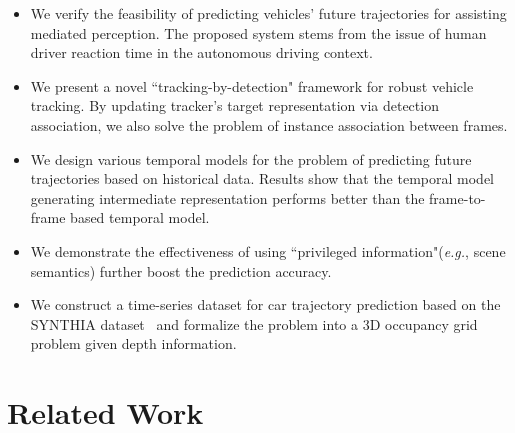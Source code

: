 \documentclass[10pt,twocolumn,letterpaper]{article}
\begin{document}
\begin{itemize}

\item We verify the feasibility of predicting vehicles' future trajectories for assisting mediated perception. The proposed system stems from the issue of human driver reaction time in the autonomous driving context.

\item We present a novel ``tracking-by-detection" framework for robust vehicle tracking. By updating tracker's target representation via detection association, we also solve the problem of instance association between frames.

\item We design various temporal models for the problem of predicting future trajectories based on historical data. Results show that the temporal model generating intermediate representation performs better than the frame-to-frame based temporal model.

\item We demonstrate the effectiveness of using ``privileged information"(\emph{e.g.}, scene semantics) further boost the prediction accuracy.


\item We construct a time-series dataset for car trajectory prediction based on the SYNTHIA dataset~\cite{ros2016synthia} and  formalize the problem into a 3D occupancy grid problem given depth information.

\end{itemize}



\section{Related Work}

\end{document}
